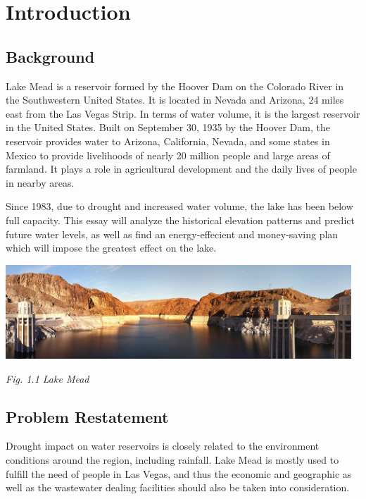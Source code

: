 \documentclass[12pt]{article}
\theoremstyle{definition}
\theoremstyle{remark}
\numberwithin{equation}{section}
\begin{document}
\section{Introduction}

	\subsection{Background}
	Lake Mead is a reservoir formed by the Hoover Dam on the Colorado River in the Southwestern United States. It is located in Nevada and Arizona, 24 miles east from the Las Vegas Strip. In terms of water volume, it is the largest reservoir in the United States. Built on September 30, 1935 by the Hoover Dam, the reservoir provides water to Arizona, California, Nevada, and some states in Mexico to provide livelihoods of nearly 20 million people and large areas of farmland. It plays a role in agricultural development and the daily lives of people in nearby areas.

	Since 1983, due to drought and increased water volume, the lake has been below full capacity. This essay will analyze the historical elevation patterns and predict future water levels, as well as find an energy-effecient and money-saving plan which will impose the greatest effect on the lake. \cite{Lake Mead}


		\begin{center}
		\includegraphics[width=13cm]{1.1 Lake Mead.jpg}

		\small \textit{Fig. 1.1 Lake Mead}
		\end{center}

	\subsection{Problem Restatement}
		Drought impact on water reservoirs is closely related to the environment conditions around the region, including rainfall.
		Lake Mead is mostly used to fulfill the need of people in Las Vegas, and thus the economic and geographic as well as the wastewater
		dealing facilities should also be taken into consideration.
\end{document}

